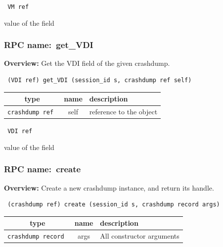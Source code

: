 \vspace{0.3cm}

{\tt 
VM ref
}


value of the field
\vspace{0.3cm}
\vspace{0.3cm}
\vspace{0.3cm}
\subsubsection{RPC name:~get\_VDI}

{\bf Overview:} 
Get the VDI field of the given crashdump.

\begin{verbatim} (VDI ref) get_VDI (session_id s, crashdump ref self)\end{verbatim}



 
\vspace{0.3cm}
\begin{tabular}{|c|c|p{7cm}|}
 \hline
{\bf type} & {\bf name} & {\bf description} \\ \hline
{\tt crashdump ref } & self & reference to the object \\ \hline 

\end{tabular}

\vspace{0.3cm}

{\tt 
VDI ref
}


value of the field
\vspace{0.3cm}
\vspace{0.3cm}
\vspace{0.3cm}
\subsubsection{RPC name:~create}

{\bf Overview:} 
Create a new crashdump instance, and return its handle.

\begin{verbatim} (crashdump ref) create (session_id s, crashdump record args)\end{verbatim}



 
\vspace{0.3cm}
\begin{tabular}{|c|c|p{7cm}|}
 \hline
{\bf type} & {\bf name} & {\bf description} \\ \hline
{\tt crashdump record } & args & All constructor arguments \\ \hline 

\end{tabular}

